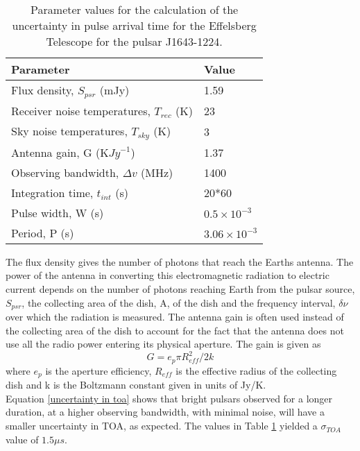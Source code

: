 \documentclass[12pt]{article}
\begin{document}
	\begin{table}[ht!]
		\centering
		\begin{tabular}{l|l}
			Parameter & Value \\\hline
			Flux density, $S_{psr}$ (mJy)& 1.59 \\
			Receiver noise temperatures, $T_{rec}$ (K) & 23\\
			Sky noise temperatures, $T_{sky}$ (K) & 3\\
			Antenna gain, G (K${Jy}^{-1}$)&1.37\\
			Observing bandwidth, $\Delta{v}$ (MHz) & 1400\\
			Integration time, $t_{int}$ (s)& 20*60\\
			Pulse width, W (s)&$0.5 \times 10^{-3}$\\
			Period, P (s) & $3.06 \times 10^{-3}$ 	
		\end{tabular}
		\caption{\label{tab:noise}Parameter values for the calculation of the uncertainty in pulse arrival time for the Effelsberg Telescope for the pulsar J1643-1224.}
	\end{table} 
	The flux density gives the number of photons that reach the Earths antenna. The power of the antenna in converting this electromagnetic radiation to electric current depends on the number of photons reaching Earth from the pulsar source, $S_{psr}$, the collecting area of the dish, A, of the dish and the frequency interval, $\delta \nu$ over which the radiation is measured. The antenna gain is often used instead of the collecting area of the dish to account for the fact that the antenna does not use all the radio power entering its physical aperture. The gain is given as
	\begin{equation}\label{gain}
	G=e_p \pi R_{eff}^2/2k
	\end{equation}
	where $e_p$ is the aperture efficiency, $R_{eff}$ is the effective radius of the collecting dish and k is the Boltzmann constant given in units of Jy/K.\\
	\noindent Equation \ref{uncertainty in toa} shows that bright pulsars observed for a longer duration, at a higher observing bandwidth, with minimal noise, will have a smaller uncertainty in TOA, as expected. The values in Table \ref{tab:noise} yielded a $\sigma_{TOA}$ value of $1.5 \mu s$.\\
\end{document}
